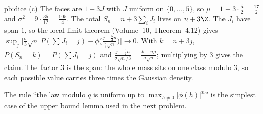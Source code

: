 \begin{solution}{pb:dice}
(c) The faces are $1+3J$ with $J$ uniform on $\{0,\dots,5\}$, so $\mu=1+3\cdot\frac52=\frac{17}2$ and $\sigma^2=9\cdot\frac{35}{12}=\frac{105}4$. The total $S_n=n+3\sum_iJ_i$ lives on
$n+3\Z$. The $J_i$ have span $1$, so the local limit theorem (Volume~10, Theorem~4.12) gives
$\sup_j\bigl|\frac\sigma3\sqrt n\,P(\sum J_i=j)-\phi\bigl(\frac{j-\frac52n}{\frac\sigma3\sqrt n}\bigr)\bigr|\to0$. With $k=n+3j$, $P(S_n=k)=P(\sum J_i=j)$ and
$\frac{j-\frac52n}{\sigma\sqrt n/3}=\frac{k-n\mu}{\sigma\sqrt n}$; multiplying by $3$ gives the claim. The factor $3$ is the span: the whole mass sits on one class modulo $3$,
so each possible value carries three times the Gaussian density.

\leads The rule ``the law modulo $q$ is uniform up to $\max_{h\ne0}|\phi(h)|^n$'' is the simplest case of the upper bound lemma used in the next problem.
\end{solution}

